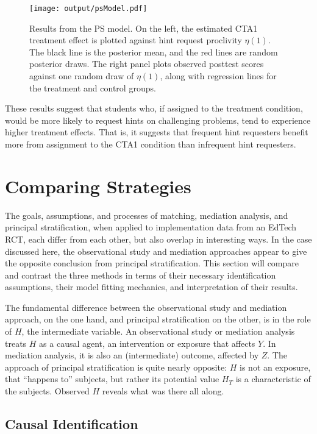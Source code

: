 \documentclass{article}\usepackage[]{graphicx}\usepackage[]{color}
\begin{document}
\begin{figure}
\centering
\texttt{[image: output/psModel.pdf]}
\caption{Results from the PS model. On the left, the estimated
  CTA1 treatment effect is plotted against hint request proclivity
  $\eta(1)$. The black line is the posterior mean, and the red lines
  are random posterior draws. The right panel plots observed posttest
  scores against one random draw of $\eta(1)$, along with regression
  lines for the treatment and control groups.}
\label{fig:psResults}
\end{figure}

These results suggest that students who, if assigned to the treatment
condition, would be more likely to request hints on challenging
problems, tend to experience higher treatment effects.
That is, it suggests that frequent hint requesters benefit more from
assignment to the CTA1 condition than infrequent hint requesters.

\section{Comparing Strategies}\label{sec:synthesis}
The goals, assumptions, and processes of matching, mediation analysis,
and principal stratification, when applied to implementation data from
an EdTech RCT, each differ from each other, but also overlap in
interesting ways.
In the case discussed here, the observational study and mediation
approaches appear to give the opposite conclusion from principal
stratification.
This section will compare and contrast the three methods in terms of
 their necessary identification assumptions, their model fitting
 mechanics, and interpretation of their results.

The fundamental difference between the observational study and
mediation approach, on the one hand, and principal stratification on
the other, is in the role of $H$, the intermediate variable.
An observational study or mediation analysis treats $H$ as a causal
agent, an intervention or exposure that affects $Y$.
In mediation analysis, it is also an (intermediate) outcome, affected
by $Z$.
The approach of principal stratification is quite nearly opposite:
$H$ is not an exposure, that ``happens to'' subjects, but rather its
potential value $H_T$ is a characteristic of the subjects.
Observed $H$ reveals what was there all along.


\subsection{Causal Identification}
\end{document}
